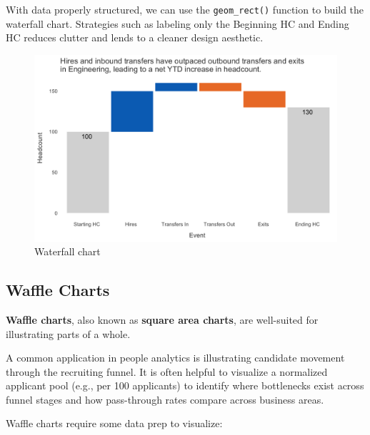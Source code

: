 \documentclass[
]{book}
\begin{document}
With data properly structured, we can use the \texttt{geom\_rect()} function to build the waterfall chart. Strategies such as labeling only the Beginning HC and Ending HC reduces clutter and lends to a cleaner design aesthetic.

\begin{figure}

{\centering \includegraphics[width=1\linewidth]{graphics/waterfall_chart} 

}

\caption{Waterfall chart}\label{fig:waterfl-chart}
\end{figure}

\hypertarget{waffle-charts}{%
\subsection{Waffle Charts}\label{waffle-charts}}

\textbf{Waffle charts}, also known as \textbf{square area charts}, are well-suited for illustrating parts of a whole.

A common application in people analytics is illustrating candidate movement through the recruiting funnel. It is often helpful to visualize a normalized applicant pool (e.g., per 100 applicants) to identify where bottlenecks exist across funnel stages and how pass-through rates compare across business areas.

Waffle charts require some data prep to visualize:
\end{document}
